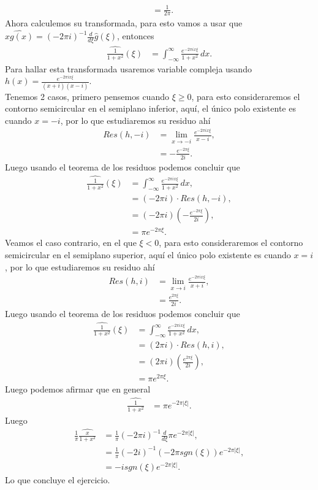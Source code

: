 \begin{homeworkProblem}
\begin{solution}
\begin{align*}
      &=\frac{1}{2\pi}.
    \end{align*}
    Ahora calculemos su transformada, para esto vamos a usar que $\hat{xg(x)}=(-2\pi i)^{-1}\frac{d}{d\xi}\hat{g}(\xi)$, entonces
    \begin{align*}
      \hat{\frac{1}{1+x^2}}(\xi)&=\int_{-\infty}^{\infty}\frac{e^{-2\pi ix\xi}}{1+x^2}\, dx.
    \end{align*}
    Para hallar esta transformada usaremos variable compleja usando $h(x)=\frac{e^{-2\pi ix\xi}}{(x+i)(x-i)}$.\\
    Tenemos 2 casos, primero pensemos cuando $\xi\geq 0$, para esto consideraremos el contorno semicircular en el semiplano inferior, aquí, el único polo existente es cuando $x=-i$, por lo que estudiaremos su residuo ahí
    \begin{align*}
      Res(h,-i)&=\lim_{x \to -i}\frac{e^{-2\pi ix\xi}}{x-i},\\
      &=-\frac{e^{-2\pi \xi}}{2i}.
    \end{align*}
    Luego usando el teorema de los residuos podemos concluir que
    \begin{align*}
      \hat{\frac{1}{1+x^2}}(\xi)&=\int_{-\infty}^{\infty}\frac{e^{-2\pi ix\xi}}{1+x^2}\, dx,\\
      &=(-2\pi i)\cdot Res(h,-i),\\
      &=(-2\pi i)\left( -\frac{e^{-2\pi\xi}}{2i} \right),\\
      &=\pi e^{-2\pi\xi}.
    \end{align*}
    Veamos el caso contrario, en el que $\xi<0$, para esto consideraremos el contorno semicircular en el semiplano superior, aquí el único polo existente es cuando $x=i$, por lo que estudiaremos su residuo ahí
    \begin{align*}
      Res(h,i)&=\lim_{x \to i}\frac{e^{-2\pi ix\xi}}{x+i},\\
      &=\frac{e^{2\pi \xi}}{2i}.
    \end{align*}
    Luego usando el teorema de los residuos podemos concluir que
    \begin{align*}
      \hat{\frac{1}{1+x^2}}(\xi)&=\int_{-\infty}^{\infty}\frac{e^{-2\pi ix\xi}}{1+x^2}\, dx,\\
      &=(2\pi i)\cdot Res(h,i),\\
      &=(2\pi i)\left( \frac{e^{2\pi\xi}}{2i} \right),\\
      &=\pi e^{2\pi\xi}.
    \end{align*}
    Luego podemos afirmar que en general
    \begin{align*}
      \hat{\frac{1}{1+x^2}}&=\pi e^{-2\pi|\xi|}.
    \end{align*}
    Luego
    \begin{align*}
      \frac{1}{\pi}\hat{\frac{x}{1+x^2}}&=\frac{1}{\pi}(-2\pi i)^{-1}\frac{d}{d\xi}\pi e^{-2\pi|\xi|},\\
      &=\frac{1}{\pi}(-2i)^{-1}(-2\pi sgn(\xi))e^{-2\pi|\xi|},\\
      &=-i sgn(\xi)e^{-2\pi|\xi|}.
    \end{align*}
    Lo que concluye el ejercicio.
  \end{solution}
\end{homeworkProblem}
